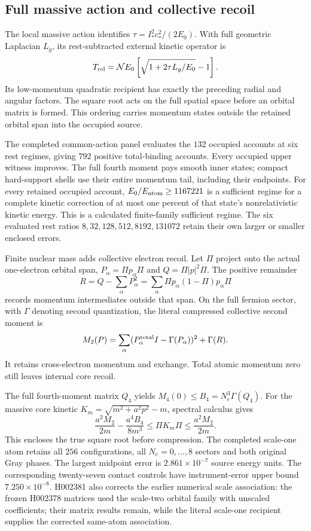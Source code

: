\subsection{Full massive action and collective recoil}

The local massive action identifies $\tau=I_*^2c_*^2/(2E_0)$. With full geometric Laplacian $L_g$, its rest-subtracted external kinetic operator is
\[
 T_{\rm rel}=\mathcal N E_0
 \left[\sqrt{1+2\tau L_g/E_0}-1\right].
\]
Its low-momentum quadratic recipient has exactly the preceding radial and angular factors. The square root acts on the full spatial space before an orbital matrix is formed. This ordering carries momentum states outside the retained orbital span into the occupied source. 

The completed common-action panel evaluates the $132$ occupied accounts at six rest regimes, giving $792$ positive total-binding accounts. Every occupied upper witness improves. The full fourth moment pays smooth inner states; compact hard-support shells use their entire momentum tail, including their endpoints. For every retained occupied account, $E_0/E_{\rm atom}\geq1167221$ is a sufficient regime for a complete kinetic correction of at most one percent of that state's nonrelativistic kinetic energy. This is a calculated finite-family sufficient regime. The six evaluated rest ratios $8,32,128,512,8192,131072$ retain their own larger or smaller enclosed errors.

Finite nuclear mass adds collective electron recoil. Let $\Pi$ project onto the actual one-electron orbital span, $P_\alpha=\Pi p_\alpha\Pi$ and $Q=\Pi|p|^2\Pi$. The positive remainder
\[
 R=Q-\sum_\alpha P_\alpha^2
   =\sum_\alpha\Pi p_\alpha(1-\Pi)p_\alpha\Pi
\]
records momentum intermediates outside that span. On the full fermion sector, with $\Gamma$ denoting second quantization, the literal compressed collective second moment is
\[
 M_2(P)=\sum_\alpha(P_\alpha^{\rm total}I-\Gamma(P_\alpha))^2+\Gamma(R).
\]
It retains cross-electron momentum and exchange. Total atomic momentum zero still leaves internal core recoil. 

The full fourth-moment matrix $Q_4$ yields $M_4(0)\leq B_4=N_e^3\Gamma(Q_4)$. For the massive core kinetic $K_m=\sqrt{m^2+a^2p^2}-m$, spectral calculus gives
\[
 \frac{a^2M_2}{2m}-\frac{a^4B_4}{8m^3}
 \leq\Pi K_m\Pi\leq\frac{a^2M_2}{2m}.
\]
This encloses the true square root before compression. The completed scale-one atom retains all $256$ configurations, all $N_e=0,\ldots,8$ sectors and both original Gray phases. The largest midpoint error is $2.861\times10^{-7}$ source energy units. The corresponding twenty-seven contact controls have instrument-error upper bound $7.250\times10^{-8}$. H002381 also corrects the earlier numerical scale association: the frozen H002378 matrices used the scale-two orbital family with unscaled coefficients; their matrix results remain, while the literal scale-one recipient supplies the corrected same-atom association.

